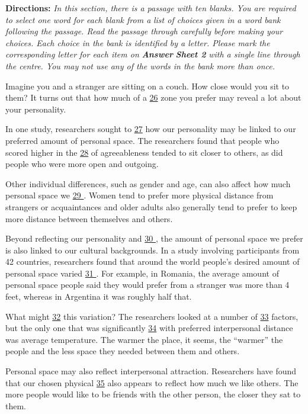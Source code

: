 \documentclass[UTF8,11pt]{ctexart}
\begin{document}
\textbf{Directions:} \textit{In this section, there is a passage with ten blanks. You are required to select one word for each blank from a} \textit{list of choices given in a word bank following the passage. Read the passage through carefully before making your} \textit{choices. Each choice in the bank is identified by a letter. Please mark the corresponding letter for each item on }\textbf{\textit{Answer}} \textbf{\textit{Sheet 2}}\textit{ with a single line through the centre. You may not use any of the words in the bank more than once.}


Imagine you and a stranger are sitting on a couch. How close would you sit to them? It turns out that how much of a \uline{26} zone you prefer may reveal a lot about your personality.


In one study, researchers sought to \uline{27} how our personality may be linked to our preferred amount of personal space. The researchers found that people who scored higher in the \uline{28} of agreeableness tended to sit closer to others, as did people who were more open and outgoing.


Other individual differences, such as gender and age, can also affect how much personal space we \uline{29 }. Women tend to prefer more physical distance from strangers or acquaintances and older adults also generally tend to prefer to keep more distance between themselves and others.


Beyond reflecting our personality and \uline{30 }, the amount of personal space we prefer is also linked to our cultural backgrounds. In a study involving participants from 42 countries, researchers found that around the world people’s desired amount of personal space varied \uline{31 }. For example, in Romania, the average amount of personal space people said they would prefer from a stranger was more than 4 feet, whereas in Argentina it was roughly half that.


What might \uline{32} this variation? The researchers looked at a number of \uline{33} factors, but the only one that was significantly \uline{34} with preferred interpersonal distance was average temperature. The warmer the place, it seems, the “warmer” the people and the less space they needed between them and others.


Personal space may also reflect interpersonal attraction. Researchers have found that our chosen physical \uline{35} also appears to reflect how much we like others. The more people would like to be friends with the other person, the closer they sat to them.
\end{document}
